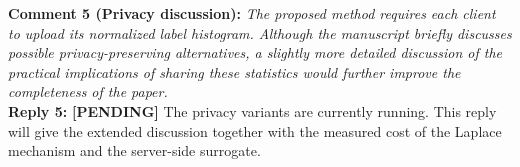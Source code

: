 \documentclass[10pt]{article}
\newcommand{\PENDING}[1]{{\color{red}\textbf{[PENDING] }#1}}
\begin{document}
\noindent
\textbf{Comment 5 (Privacy discussion):} \textit{The proposed method requires each client to upload its normalized label histogram. Although the manuscript briefly discusses possible privacy-preserving alternatives, a slightly more detailed discussion of the practical implications of sharing these statistics would further improve the completeness of the paper.} \\
\noindent
\textbf{Reply 5:} \PENDING{The privacy variants are currently running. This reply will give the extended discussion together with the measured cost of the Laplace mechanism and the server-side surrogate.}\\
\end{document}
